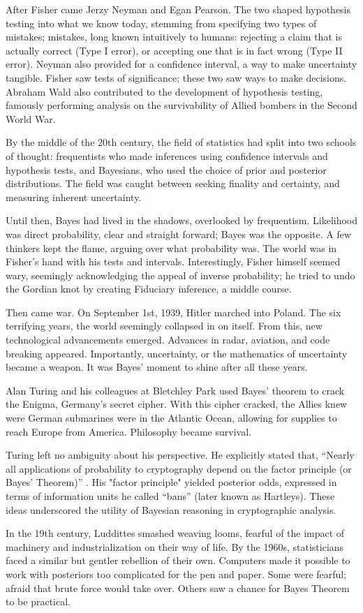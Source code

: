After Fisher came Jerzy Neyman and Egan Pearson.  
The two shaped hypothesis testing into what we know today, stemming from specifying two types of mistakes; mistakes, long known intuitively to humans: rejecting a claim that is actually correct (Type I error), or accepting one that is in fact wrong (Type II error).  
Neyman also provided for a confidence interval, a way to make uncertainty tangible.  
Fisher saw tests of significance; these two saw ways to make decisions.  
Abraham Wald also contributed to the development of hypothesis testing, famously performing analysis on the survivability of Allied bombers in the Second World War. 

By the middle of the 20th century, the field of statistics had split into two schools of thought: frequentists who made inferences using confidence intervals and hypothesis tests, and Bayesians, who used the choice of prior and posterior distributions.  
The field was caught between seeking finality and certainty, and measuring inherent uncertainty. 

Until then, Bayes had lived in the shadows, overlooked by frequentism.  
Likelihood was direct probability, clear and straight forward; Bayes was the opposite.  
A few thinkers kept the flame, arguing over what probability was\cite{fienberg_when_2006}.  
The world was in Fisher's hand with his tests and intervals. 
Interestingly, Fisher himself seemed wary, seemingly acknowledging the appeal of inverse probability; he tried to undo the Gordian knot by creating Fiduciary inference, a middle course\cite{pederson_fiducial_1978}. 

Then came war.  On September 1st, 1939, Hitler marched into Poland.  
The six terrifying years, the world seemingly collapsed in on itself.  
From this, new technological advancements emerged.  
Advances in radar, aviation, and code breaking appeared\cite{fienberg_when_2006}.  
Importantly, uncertainty, or the mathematics of uncertainty became a weapon.  
It was Bayes' moment to shine after all these years.  

Alan Turing and his colleagues at Bletchley Park used Bayes' theorem to crack the Enigma, Germany's secret cipher.  
With this cipher cracked, the Allies knew were German submarines were in the Atlantic Ocean, allowing for supplies to reach Europe from America.  
Philosophy became survival.

Turing left no ambiguity about his perspective. He explicitly stated that, “Nearly all applications of probability to cryptography depend on the factor principle (or Bayes’ Theorem)” \cite{taylor_alan_2015}. 
His "factor principle" yielded posterior odds, expressed in terms of information units he called “bans” (later known as Hartleys). 
These ideas underscored the utility of Bayesian reasoning in cryptographic analysis.

In the 19th century, Luddittes smashed weaving looms, fearful of the impact of machinery and industrialization on their way of life.  
By the 1960s, statisticians faced a similar but gentler rebellion of their own.  
Computers made it possible to work with posteriors too complicated for the pen and paper.  
Some were fearful; afraid that brute force would take over.  
Others saw a chance for Bayes Theorem to be practical.  
